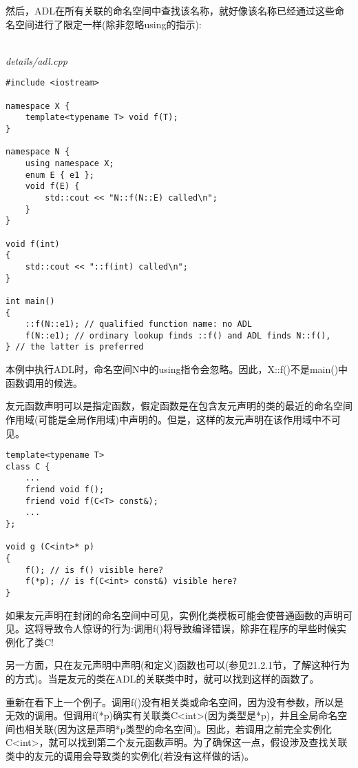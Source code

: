 然后，ADL在所有关联的命名空间中查找该名称，就好像该名称已经通过这些命名空间进行了限定一样(除非忽略using的指示):

\hspace*{\fill} \\ %
\noindent
\textit{details/adl.cpp}
\begin{lstlisting}[style=styleCXX]
#include <iostream>

namespace X {
	template<typename T> void f(T);
}

namespace N {
	using namespace X;
	enum E { e1 };
	void f(E) {
		std::cout << "N::f(N::E) called\n";
	}
}

void f(int)
{
	std::cout << "::f(int) called\n";
}

int main()
{
	::f(N::e1); // qualified function name: no ADL
	f(N::e1); // ordinary lookup finds ::f() and ADL finds N::f(),
} // the latter is preferred
\end{lstlisting}

本例中执行ADL时，命名空间N中的using指令会忽略。因此，X::f()不是main()中函数调用的候选。


友元函数声明可以是指定函数，假定函数是在包含友元声明的类的最近的命名空间作用域(可能是全局作用域)中声明的。但是，这样的友元声明在该作用域中不可见。

\begin{lstlisting}[style=styleCXX]
template<typename T>
class C {
	...
	friend void f();
	friend void f(C<T> const&);
	...
};

void g (C<int>* p)
{
	f(); // is f() visible here?
	f(*p); // is f(C<int> const&) visible here?
}
\end{lstlisting}

如果友元声明在封闭的命名空间中可见，实例化类模板可能会使普通函数的声明可见。这将导致令人惊讶的行为:调用f()将导致编译错误，除非在程序的早些时候实例化了类C!

另一方面，只在友元声明中声明(和定义)函数也可以(参见21.2.1节，了解这种行为的方式)。当是友元的类在ADL的关联类中时，就可以找到这样的函数了。

重新在看下上一个例子。调用f()没有相关类或命名空间，因为没有参数，所以是无效的调用。但调用f(*p)确实有关联类C<int>(因为类型是*p)，并且全局命名空间也相关联(因为这是声明*p类型的命名空间)。因此，若调用之前完全实例化C<int>，就可以找到第二个友元函数声明。为了确保这一点，假设涉及查找关联类中的友元的调用会导致类的实例化(若没有这样做的话)。

